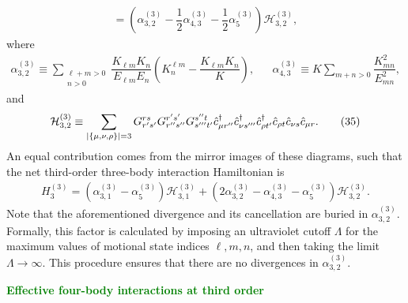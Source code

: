 \documentclass[preprint,showkeys,nofootinbib]{revtex4-1}
\newcommand{\f}{\dfrac} %
\newcommand{\p}[1]{\left(#1\right)} %
\renewcommand{\set}[1]{\left\{#1\right\}} %
\renewcommand{\c}{\hat{c}}
\newcommand{\n}{\hat{n}}
\renewcommand{\H}{\mathcal{H}}
\newcommand{\1}{\mathds{1}}
\newcommand{\green}[1]{\textcolor{green}{#1}}
\begin{document}
\begin{enumerate}
{\begin{multline}
      = \p{\alpha_{3,2}^{(3)}
        - \f12\alpha_{4,3}^{(3)} - \f12\alpha_5^{(3)}}
      \H_{3,2}^{(3)},
      \tag{33}
    \end{multline}
    where
    \begin{align}
      \alpha_{3,2}^{(3)}
      \equiv \sum_{\substack{\ell+m>0\\n>0}}
      \f{K_{\ell m} K_n}{E_{\ell m} E_n}
      \p{K^{\ell m}_n - \f{K_{\ell m} K_n}{K}},
      &&
      \alpha_{4,3}^{(3)}
      \equiv K \sum_{m+n>0} \f{K_{mn}^2}{E_{mn}^2},
      \tag{34}
    \end{align}
    and
    \begin{align}
      \H_{3,2}^{(3)} \equiv \sum_{\abs{\set{\mu,\nu,\rho}}=3}
      G^{rs}_{r's'} G^{r's'}_{r''s''} G^{s''t}_{s'''t'}
      \c_{\mu r''}^\dag \c_{\nu s'''}^\dag \c_{\rho t'}^\dag
      \c_{\rho t} \c_{\nu s} \c_{\mu r}.
      \tag{35}
    \end{align}
    An equal contribution comes from the mirror images of these
    diagrams, such that the net third-order three-body interaction
    Hamiltonian is
    \begin{align}
      H_3^{(3)} = \p{\alpha_{3,1}^{(3)} - \alpha_5^{(3)}} \H_{3,1}^{(3)}
      + \p{2\alpha_{3,2}^{(3)} - \alpha_{4,3}^{(3)} - \alpha_5^{(3)}}
      \H_{3,2}^{(3)}.
      \tag{36}
    \end{align}
    Note that the aforementioned divergence and its cancellation are
    buried in $\alpha_{3,2}^{(3)}$.  Formally, this factor is
    calculated by imposing an ultraviolet cutoff $\Lambda$ for the
    maximum values of motional state indices $\ell,m,n$, and then
    taking the limit $\Lambda\to\infty$.  This procedure ensures that
    there are no divergences in $\alpha_{3,2}^{(3)}$.}

  \green{{\bf Effective four-body interactions at third order}}


\end{enumerate}
\end{document}
